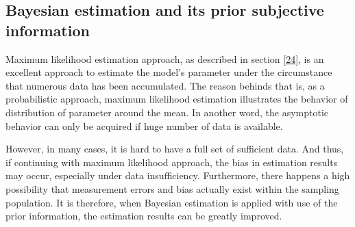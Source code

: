 \subsection{Bayesian estimation and its prior subjective information}
\label{252}
Maximum likelihood estimation approach, as described in section \ref{24}, is an excellent approach to estimate the model's parameter under the circumstance that numerous data has been accumulated. The reason behinds that is, as a probabilistic approach, maximum likelihood estimation illustrates the behavior of distribution of parameter around the mean. In another word, the asymptotic behavior can only be acquired if huge number of data is available. 

However, in many cases, it is hard to have a full set of sufficient data. And thus, if continuing with maximum likelihood approach, the bias in estimation results may occur, especially under data insufficiency. Furthermore, there happens a high possibility that measurement errors and bias actually exist within the sampling population. It is therefore, when Bayesian estimation is applied with use of the prior information, the estimation results can be greatly improved.

